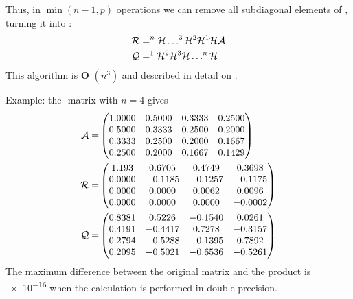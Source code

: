 Thus, in \(\min(n-1, p) \) operations we can remove all subdiagonal elements of , turning it into :
\begin{align}
  \mathcal{R} &= ^n\mathcal{H} \ldots ^3\mathcal{H} ^2\mathcal{H} ^1\mathcal{H} \mathcal{A} \\
  \mathcal{Q} &= ^1\mathcal{H} ^2\mathcal{H} ^3\mathcal{H} \ldots ^n\mathcal{H}
\end{align}
This algorithm is \textbf{O} \( (n^3) \) and described in detail on \parencite{Ros-18, Lub-04}.

Example: the -matrix with \(n = 4 \) gives
\begin{eqnarray}
  \mathcal{A} =&
  \begin{pmatrix}
     1.0000 & 0.5000 & 0.3333 & 0.2500 \\
     0.5000 & 0.3333 & 0.2500 & 0.2000 \\
     0.3333 & 0.2500 & 0.2000 & 0.1667 \\
     0.2500 & 0.2000 & 0.1667 & 0.1429
  \end{pmatrix} \\
  \mathcal{R} =&
  \begin{pmatrix}
     1.193   &  0.6705 &  0.4749  &  0.3698 \\
     0.0000  & -0.1185 & -0.1257  & -0.1175 \\
     0.0000  &  0.0000 &  0.0062  &  0.0096 \\
     0.0000  &  0.0000 &  0.0000  & -0.0002
  \end{pmatrix} \\
  \mathcal{Q} =&
  \begin{pmatrix}
     0.8381  &  0.5226 & -0.1540  &  0.0261 \\
     0.4191  & -0.4417 &  0.7278  & -0.3157 \\
     0.2794  & -0.5288 & -0.1395  &  0.7892 \\
     0.2095  & -0.5021 & -0.6536  & -0.5261
   \end{pmatrix}
\end{eqnarray}
The maximum difference between the original  matrix and the product  is \num{e-16} when the calculation is performed in double precision.

